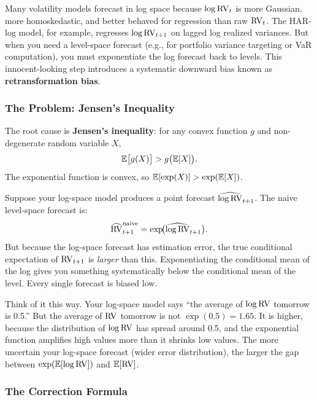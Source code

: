 Many volatility models forecast in log space because $\log \operatorname{RV}_t$ is more Gaussian, more homoskedastic, and better behaved for regression than raw $\operatorname{RV}_t$.
The HAR-log model, for example, regresses $\log \operatorname{RV}_{t+1}$ on lagged log realized variances.
But when you need a level-space forecast (e.g., for portfolio variance targeting or VaR computation), you must exponentiate the log forecast back to levels.
This innocent-looking step introduces a systematic downward bias known as \textbf{retransformation bias}.

\subsubsection{The Problem: Jensen's Inequality}

The root cause is \textbf{Jensen's inequality}: for any convex function $g$ and non-degenerate random variable $X$,
\begin{equation}
\label{eq:jensen}
\mathbb{E}\bigl[g(X)\bigr] > g\bigl(\mathbb{E}[X]\bigr).
\end{equation}
The exponential function is convex, so $\mathbb{E}[\exp(X)] > \exp(\mathbb{E}[X])$.

Suppose your log-space model produces a point forecast $\widehat{\log \operatorname{RV}}_{t+1}$.
The naive level-space forecast is:
\[
\widehat{\operatorname{RV}}^{\text{naive}}_{t+1} = \exp\!\bigl(\widehat{\log \operatorname{RV}}_{t+1}\bigr).
\]
But because the log-space forecast has estimation error, the true conditional expectation of $\operatorname{RV}_{t+1}$ is \emph{larger} than this.
Exponentiating the conditional mean of the log gives you something systematically below the conditional mean of the level.
Every single forecast is biased low.

\begin{intuition}
Think of it this way.
Your log-space model says ``the average of $\log \operatorname{RV}$ tomorrow is 0.5.''
But the average of $\operatorname{RV}$ tomorrow is not $\exp(0.5) = 1.65$.
It is higher, because the distribution of $\log \operatorname{RV}$ has spread around 0.5, and the exponential function amplifies high values more than it shrinks low values.
The more uncertain your log-space forecast (wider error distribution), the larger the gap between $\exp(\mathbb{E}[\log \operatorname{RV}])$ and $\mathbb{E}[\operatorname{RV}]$.
\end{intuition}

\subsubsection{The Correction Formula}

